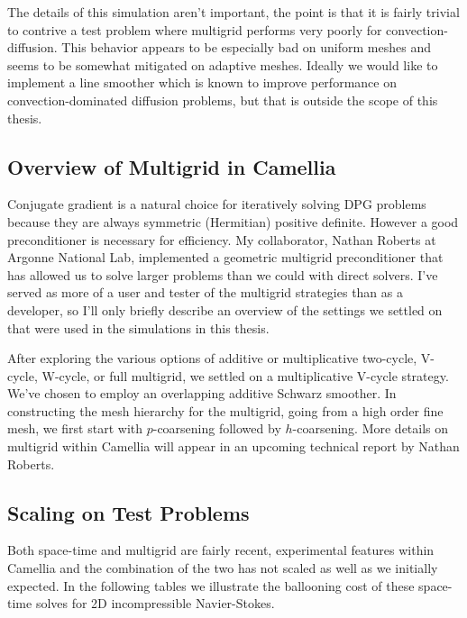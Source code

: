 \documentclass[Dissertation.tex]{subfiles}
\begin{document}
The details of this simulation aren't important, the point is that it is fairly trivial to contrive a 
test problem where multigrid performs very poorly for convection-diffusion.
This behavior appears to be especially bad on uniform meshes and seems to be somewhat mitigated on adaptive meshes.
Ideally we would like to implement a line smoother which is known to improve performance 
on convection-dominated diffusion problems, but that is outside the scope of this thesis.

\subsection{Overview of Multigrid in Camellia}
Conjugate gradient is a natural choice for iteratively solving DPG problems because they are always symmetric
(Hermitian) positive definite.
However a good preconditioner is necessary for efficiency.
My collaborator, Nathan Roberts at Argonne National Lab, implemented a geometric multigrid preconditioner
that has allowed us to solve larger problems than we could with direct solvers.
I've served as more of a user and tester of the multigrid strategies than as a developer, so
I'll only briefly describe an overview of the settings we settled on 
that were used in the simulations in this thesis.

After exploring the various options of additive or multiplicative two-cycle, V-cycle, W-cycle, or full multigrid,
we settled on a multiplicative V-cycle strategy.
We've chosen to employ an overlapping additive Schwarz smoother.
In constructing the mesh hierarchy for the multigrid, going from a high order fine mesh, we first start
with $p$-coarsening followed by $h$-coarsening.
More details on multigrid within Camellia will appear in an upcoming technical report by Nathan Roberts.

\subsection{Scaling on Test Problems}
Both space-time and multigrid are fairly recent, experimental features within Camellia
and the combination of the two has not scaled as well as we initially expected. 
In the following tables we illustrate the ballooning cost of these space-time solves 
for 2D incompressible Navier-Stokes.
\end{document}
